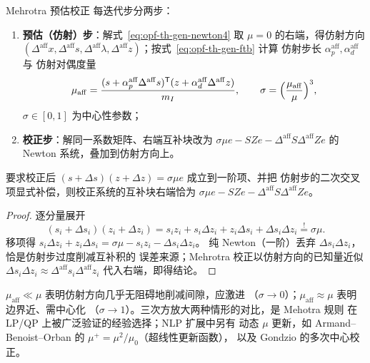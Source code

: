 \begin{definition}[仿射方向与中心性参数]\label{def:opf-th-gen-mehrotra}
Mehrotra 预估校正\cite{opft:mehrotra} 每迭代步分两步：
\begin{enumerate}
  \item \textbf{预估（仿射）步}：解式~\eqref{eq:opf-th-gen-newton4} 取
        $\mu=0$ 的右端，得仿射方向 $(\Delta^{\mathrm{aff}}x,
        \Delta^{\mathrm{aff}}s,\Delta^{\mathrm{aff}}\lambda,
        \Delta^{\mathrm{aff}}z)$；按式~\eqref{eq:opf-th-gen-ftb} 计算
        仿射步长 $\alpha_p^{\mathrm{aff}},\alpha_d^{\mathrm{aff}}$ 与
        仿射对偶度量
        \begin{equation}
        \mu_{\mathrm{aff}}=\frac{(s+\alpha_p^{\mathrm{aff}}
        \Delta^{\mathrm{aff}}s)^{\mathsf T}(z+\alpha_d^{\mathrm{aff}}
        \Delta^{\mathrm{aff}}z)}{m_I},
        \qquad \sigma=\Bigl(\frac{\mu_{\mathrm{aff}}}{\mu}\Bigr)^3,
        \label{eq:opf-th-gen-sigma}
        \end{equation}
        $\sigma\in[0,1]$ 为中心性参数；
  \item \textbf{校正步}：解同一系数矩阵、右端互补块改为
        $\sigma\mu e-SZe-\Delta^{\mathrm{aff}}S\Delta^{\mathrm{aff}}Ze$
        的 Newton 系统，叠加到仿射方向上。
\end{enumerate}
\end{definition}

\begin{lemma}[校正步右端的二阶来源]\label{lem:opf-th-gen-corrector}
要求校正后 $(s+\Delta s)(z+\Delta z)=\sigma\mu e$ 成立到一阶项、并把
仿射步的二次交叉项显式补偿，则校正系统的互补块右端恰为
$\sigma\mu e-SZe-\Delta^{\mathrm{aff}}S\Delta^{\mathrm{aff}}Ze$。
\end{lemma}

\begin{proof}
逐分量展开
\begin{equation}
(s_i+\Delta s_i)(z_i+\Delta z_i)
=s_iz_i+s_i\Delta z_i+z_i\Delta s_i+\Delta s_i\Delta z_i
\stackrel{!}{=}\sigma\mu .
\end{equation}
移项得 $s_i\Delta z_i+z_i\Delta s_i=\sigma\mu-s_iz_i-\Delta s_i\Delta z_i$。
纯 Newton（一阶）丢弃 $\Delta s_i\Delta z_i$，恰是仿射步过度削减互补积的
误差来源；Mehrotra 校正以仿射方向的已知量近似
$\Delta s_i\Delta z_i\approx\Delta^{\mathrm{aff}}s_i
\Delta^{\mathrm{aff}}z_i$ 代入右端，即得结论。
\end{proof}

\begin{remark}\label{rem:opf-th-gen-sigma3}
$\mu_{\mathrm{aff}}\ll\mu$ 表明仿射方向几乎无阻碍地削减间隙，应激进
（$\sigma\to0$）；$\mu_{\mathrm{aff}}\approx\mu$ 表明边界近、需中心化
（$\sigma\to1$）。三次方放大两种情形的对比，是 Mehotra 规则
\cite{opft:mehrotra} 在 LP/QP 上被广泛验证的经验选择；NLP 扩展中另有
动态 $\mu$ 更新，如 Armand--Benoist--Orban 的
$\mu^+=\mu^2/\mu_0$（超线性更新函数\cite{opft:armand-benoist-orban}），
以及 Gondzio 的多次中心校正\cite{opft:gondzio}。
\end{remark}

